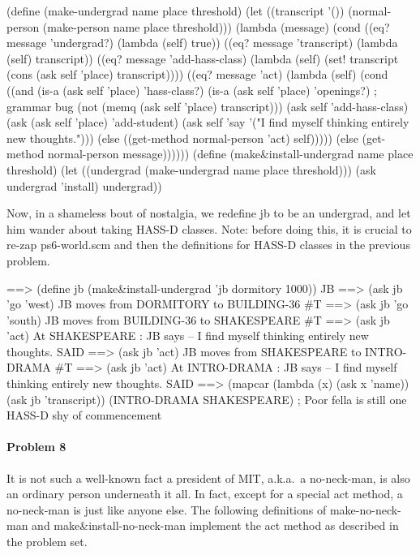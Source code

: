 \beginlisp
(define (make-undergrad name place threshold)
  (let ((transcript '())
        (normal-person (make-person name place threshold)))
    (lambda (message)
      (cond ((eq? message 'undergrad?) (lambda (self) true))
            ((eq? message 'transcript) (lambda (self) transcript))
            ((eq? message 'add-hass-class) 
             (lambda (self)
               (set! transcript (cons (ask self 'place) transcript))))
            ((eq? message 'act) 
             (lambda (self)
               (cond ((and (is-a (ask self 'place) 'hass-class?)
                           (is-a (ask self 'place) 'openings?)  ; grammar bug
                           (not (memq (ask self 'place) transcript)))
                      (ask self 'add-hass-class)
                      (ask (ask self 'place) 'add-student)
                      (ask self 'say 
                           '("I find myself thinking entirely new thoughts.")))
                     (else ((get-method normal-person 'act) self)))))
            (else (get-method normal-person message))))))
\null
\endlisp
\beginlisp
(define (make\&install-undergrad name place threshold)
  (let ((undergrad (make-undergrad name place threshold)))
    (ask undergrad 'install)
    undergrad))
\endlisp

Now, in a shameless bout of nostalgia, we redefine {\cf jb} to be an
undergrad, and let him wander about taking HASS-D classes.  Note:
before doing this, it is crucial to re-zap {\cf ps6-world.scm} and
then the definitions for HASS-D classes in the previous problem.

\beginlisp
==> (define jb (make\&install-undergrad 'jb dormitory 1000))
JB
\null
==> (ask jb 'go 'west)
JB moves from DORMITORY to BUILDING-36 
\#T
\null
==> (ask jb 'go 'south)
JB moves from BUILDING-36 to SHAKESPEARE 
\#T
\null
==> (ask jb 'act)
At SHAKESPEARE : JB says -- I find myself thinking entirely new thoughts. 
SAID
\null
\endlisp
\beginlisp
==> (ask jb 'act)
JB moves from SHAKESPEARE to INTRO-DRAMA 
\#T
\null
==> (ask jb 'act)
At INTRO-DRAMA : JB says -- I find myself thinking entirely new thoughts. 
SAID
\null
==> (mapcar (lambda (x) (ask x 'name)) (ask jb 'transcript))
(INTRO-DRAMA SHAKESPEARE)   ; Poor fella is still one HASS-D shy of commencement
\endlisp

\paragraph{Problem 8}  It is not such a well-known fact a president
of MIT, a.k.a.\ a {\cf no-neck-man}, is also an ordinary person
underneath it all.  In fact, except for a special {\cf act} method, a
{\cf no-neck-man} is just like anyone else.  The following definitions
of {\cf make-no-neck-man} and {\cf make\&install-no-neck-man} implement the
{\cf act} method as described in the problem set.

